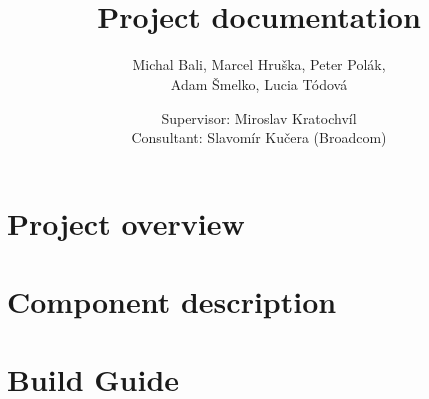 \documentclass[10pt,a4paper]{report}
\title{\textcool{\bf High Level Assembler Plugin} \\ Project documentation}
\author{Michal Bali, Marcel Hruška, Peter Polák,\\ Adam Šmelko, Lucia Tódová}
\date{Supervisor: Miroslav Kratochvíl \\ \vspace{5mm} Consultant: Slavomír Kučera (Broadcom)}
\begin{document}
\maketitle

\tableofcontents



\part{Project overview}



\part{Component description}













\part{Build Guide}


 

\end{document}
